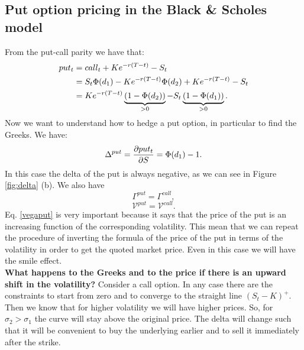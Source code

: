 \subsection{Put option pricing in the Black \& Scholes model}
From the put-call parity we have that:
\begin{align}
    \notag put_t &= call_t + Ke^{-r(T-t)} - S_t \\
    &=
    \notag S_t\Phi(d_1) - Ke^{-r(T-t)}\Phi(d_2) + Ke^{-r(T-t)} - S_t \\
    &=
    Ke^{-r(T-t)}\underbrace{(1-\Phi(d_2))}_{>0} - S_t\underbrace{(1-\Phi(d_1))}_{>0}.
\end{align}
Now we want to understand how to hedge a put option, in particular to find the Greeks. We have:
\begin{equation}
    \Delta^{put} = \pdv{put_t}{S} = \Phi(d_1)-1.
\end{equation}
In this case the delta of the put is always negative, as we can see in Figure \ref{fig:delta} (b). We also have
\begin{equation}
    \Gamma^{put} = \Gamma^{call},
\end{equation}
\begin{equation}\label{vegaput}
    \mathcal{V}^{put} = \mathcal{V}^{call}.
\end{equation}
Eq. \eqref{vegaput} is very important because it says that the price of the put is an increasing function of the corresponding volatility. This mean that we can repeat the procedure of inverting the formula of the price of the put in terms of the volatility in order to get the quoted market price. Even in this case we will have the smile effect.\\
\textbf{What happens to the Greeks and to the price if there is an upward shift in the volatility?} Consider a call option. In any case there are the constraints to start from zero and to converge to the straight line $(S_t-K)^+$. Then we know that for higher volatility we will have higher prices. So, for $\sigma_2>\sigma_1$ the curve will stay above the original price.
The delta will change such that it will be convenient to buy the underlying earlier and to sell it immediately after the strike.

